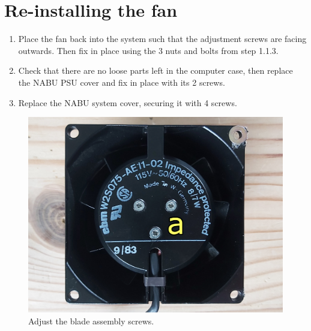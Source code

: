 \section{Re-installing the fan}
\begin{enumerate}
	\item Place the fan back into the system such that the adjustment screws are facing outwards. Then fix in place using the 3 nuts and bolts from step 1.1.3.
	\item Check that there are no loose parts left in the computer case, then replace the NABU PSU cover and fix in place with its 2 screws.
	\item Replace the NABU system cover, securing it with 4 screws.
\end{enumerate}
\newpage
\begin{figure}[h!]
	\includegraphics[width=\columnwidth]{images/fan-image-1.jpg}
	\caption[Fan blade assembly screws]{Adjust the blade assembly screws.}
	\label{fig:fanassembly}
\end{figure}
